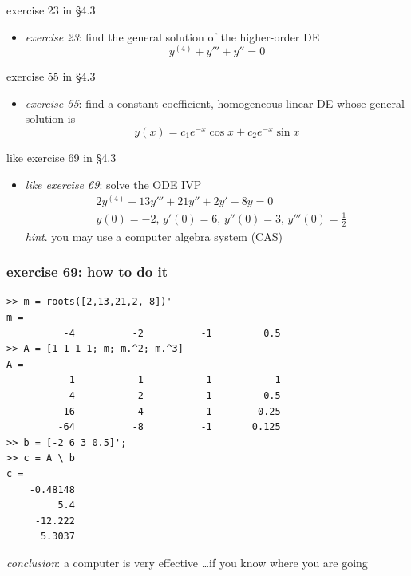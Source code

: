 \documentclass{beamer}
\begin{document}
\begin{frame}{exercise 23 in \S4.3}

\begin{itemize}
\item \emph{exercise 23}:  find the general solution of the higher-order DE
    $$y^{(4)} + y''' + y'' = 0$$
\end{itemize}

\vspace{60mm}
\end{frame}


\begin{frame}{exercise 55 in \S4.3}

\begin{itemize}
\item \emph{exercise 55}:  find a constant-coefficient, homogeneous linear DE whose general solution is
    $$y(x) = c_1 e^{-x} \cos x + c_2 e^{-x} \sin x$$
\end{itemize}

\vspace{60mm}
\end{frame}


\begin{frame}{like exercise 69 in \S4.3}

\begin{itemize}
\item \emph{like exercise 69}:  solve the ODE IVP
\begin{align*}
& 2 y^{(4)} + 13 y''' + 21 y'' + 2 y' - 8 y = 0 \\
& y(0)=-2, \, y'(0)=6, \, y''(0)=3, \, y'''(0)=\tfrac{1}{2}
\end{align*}
\emph{hint}.  you may use a computer algebra system (CAS)
\end{itemize}

\vspace{50mm}
\end{frame}


\begin{frame}[fragile]
\frametitle{exercise 69: how to do it}

\begin{Verbatim}[fontsize=\footnotesize]
>> m = roots([2,13,21,2,-8])'
m =
          -4          -2          -1         0.5
>> A = [1 1 1 1; m; m.^2; m.^3]
A =
           1           1           1           1
          -4          -2          -1         0.5
          16           4           1        0.25
         -64          -8          -1       0.125
>> b = [-2 6 3 0.5]';
>> c = A \ b
c =
    -0.48148
         5.4
     -12.222
      5.3037
\end{Verbatim}

\medskip
\emph{conclusion}:  \alert{a computer is very effective} \dots if you know where you are going
\end{frame}
\end{document}
